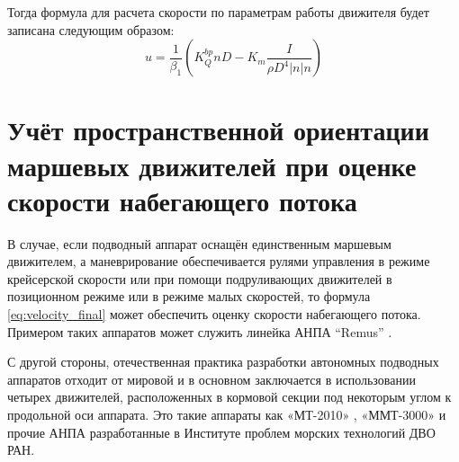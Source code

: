 

Тогда формула для расчета скорости по параметрам работы движителя будет записана следующим образом:
\begin{equation}
    \label{eq:velocity_final}
    u = \frac{1}{\beta_1} \left( K_Q^{bp} n D - K_m\frac{I}{\rho D^4|n|n} \right)
\end{equation}

\section{Учёт пространственной ориентации маршевых движителей при оценке скорости набегающего потока}
В случае, если подводный аппарат оснащён единственным маршевым движителем, а маневрирование обеспечивается рулями управления в режиме крейсерской скорости или при помощи подруливающих движителей в позиционном режиме или в режиме малых скоростей, то формула \ref{eq:velocity_final} может обеспечить оценку скорости набегающего потока.
Примером таких аппаратов может служить линейка АНПА ``Remus'' \cite{allen1997remus, kukulya2010under}.

С другой стороны, отечественная практика разработки автономных подводных аппаратов отходит от мировой и в основном заключается в использовании четырех движителей, расположенных в кормовой секции под некоторым углом к продольной оси аппарата.
Это такие аппараты как «МТ-2010» \cite{борейко2011малогабаритный}, «ММТ-3000» \cite{горнак2007ммт} и прочие АНПА разработанные в Институте проблем морских технологий ДВО РАН. 

